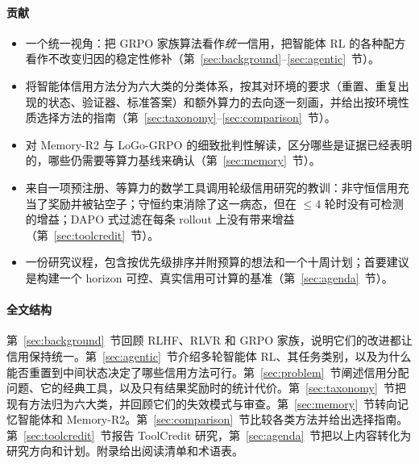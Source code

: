 \paragraph{贡献}
\begin{itemize}
  \item 一个统一视角：把 GRPO 家族算法看作\emph{统一}信用，把智能体 RL 的各种配方看作不改变归因的稳定性修补（第~\ref{sec:background}--\ref{sec:agentic}~节）。
  \item 将智能体信用方法分为六大类的分类体系，按其对环境的要求（重置、重复出现的状态、验证器、标准答案）和额外算力的去向逐一刻画，并给出按环境性质选择方法的指南（第~\ref{sec:taxonomy}--\ref{sec:comparison}~节）。
  \item 对 Memory-R2 与 LoGo-GRPO 的细致批判性解读，区分哪些是证据已经表明的，哪些仍需要等算力基线来确认（第~\ref{sec:memory}~节）。
  \item 来自一项预注册、等算力的数学工具调用轮级信用研究的教训：非守恒信用充当了奖励并被钻空子；守恒约束消除了这一病态，但在 $\leq$4 轮时没有可检测的增益；DAPO 式过滤在每条 rollout 上没有带来增益（第~\ref{sec:toolcredit}~节）。
  \item 一份研究议程，包含按优先级排序并附预算的想法和一个十周计划；首要建议是构建一个 horizon 可控、真实信用可计算的基准（第~\ref{sec:agenda}~节）。
\end{itemize}

\paragraph{全文结构}
第~\ref{sec:background}~节回顾 RLHF、RLVR 和 GRPO 家族，说明它们的改进都让信用保持统一。第~\ref{sec:agentic}~节介绍多轮智能体 RL、其任务类别，以及为什么能否重置到中间状态决定了哪些信用方法可行。第~\ref{sec:problem}~节阐述信用分配问题、它的经典工具，以及只有结果奖励时的统计代价。第~\ref{sec:taxonomy}~节把现有方法归为六大类，并回顾它们的失效模式与审查。第~\ref{sec:memory}~节转向记忆智能体和 Memory-R2。第~\ref{sec:comparison}~节比较各类方法并给出选择指南。第~\ref{sec:toolcredit}~节报告 ToolCredit 研究，第~\ref{sec:agenda}~节把以上内容转化为研究方向和计划。附录给出阅读清单和术语表。
